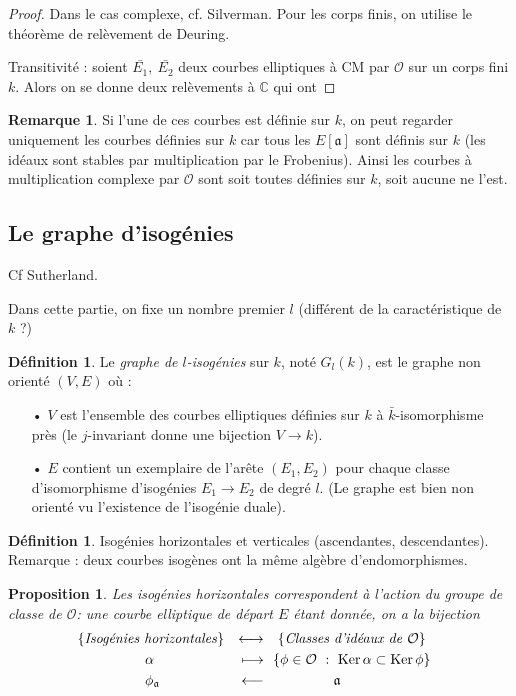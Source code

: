 \documentclass[11pt,a4paper]{article}
\newcommand{\C}{\mathbb{C}}
\renewcommand{\O}{\mathcal{O}}
\newcommand{\vers}{\rightarrow}
\renewcommand{\frak}{\mathfrak}
\newtheorem{prop}[thm]{Proposition}
\theoremstyle{definition}
\newtheorem*{rem}{Remarque}
\newtheorem{defi}[thm]{Définition}
\begin{document}
\begin{proof}
Dans le cas complexe, cf. Silverman. Pour les corps finis, on utilise le théorème de relèvement de Deuring.

Transitivité : soient $\bar{E_1},\ \bar{E_2}$ deux courbes elliptiques à CM par $\O$ sur un corps fini $k$. Alors on se donne deux relèvements à $\C$ qui ont 
\end{proof}


\begin{rem}
Si l'une de ces courbes est définie sur $k$, on peut regarder uniquement les courbes définies sur $k$ car tous les $E[\frak a]$ sont définis sur $k$ (les idéaux sont stables par multiplication par le Frobenius). Ainsi les courbes à multiplication complexe par $\O$ sont soit toutes définies sur $k$, soit aucune ne l'est.
\end{rem}

\subsection{Le graphe d'isogénies}

Cf Sutherland.

Dans cette partie, on fixe un nombre premier $l$ (différent de la caractéristique de $k$ ?)

\begin{defi}
Le \emph{graphe de $l$-isogénies} sur $k$, noté $G_l(k)$, est le graphe non orienté $(V,E)$ où :
\begin{itemize}
\item[•] $V$ est l'ensemble des courbes elliptiques définies sur $k$ à $\bar{k}$-isomorphisme près (le $j$-invariant donne une bijection $V\vers k$).
\item[•] $E$ contient un exemplaire de l'arête $(E_1,E_2)$ pour chaque classe d'isomorphisme d'isogénies $E_1\vers E_2$ de degré $l$. (Le graphe est bien non orienté vu l'existence de l'isogénie duale).
\end{itemize}

\end{defi}

\begin{defi}
Isogénies horizontales et verticales (ascendantes, descendantes). Remarque : deux courbes isogènes ont la même algèbre d'endomorphismes.
\end{defi}

\begin{prop}
Les isogénies horizontales correspondent à l'action du groupe de classe de $\O$: une courbe elliptique de départ $E$ étant donnée, on a la bijection
$$\begin{aligned}
& \left\{\text{\emph{Isogénies horizontales}}\right\} & \longleftrightarrow &\quad \{\text{\emph{Classes d'idéaux de}}\ \O \} &\\
& \quad\qquad\qquad \alpha & \longmapsto &\ \ \{\phi\in\O\ :\ \mathrm{Ker}\,\alpha \subset\mathrm{Ker}\,\phi\} &\\
& \quad\qquad\qquad \phi_{\frak a} & \longleftarrow & \quad\qquad\qquad \frak a &
\end{aligned}$$
\end{prop}
\end{document}
